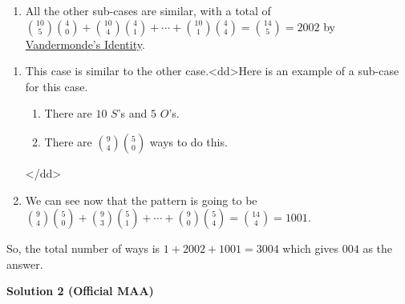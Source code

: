 \begin{enumerate}
            \begin{enumerate}[label=(\roman*)]
                <dd>
            \begin{enumerate}[label=(\roman*)]
                \item There are $6$ places to put the $I$'s (after the 0th, 2nd, 4th, 6th, 8th, and 10th $S$'s), and $4$ places to put the (0) $O$'s.  We use stars and bars to get an answer of $\binom{10}{5}\binom{4}{0}$<dt>Sub-case 2  --  There are $8$ $S$'s, $6$ $I$'s, and $1$ $O$.</dt>\item Similarly and by using stars and bars, we get an amount of $\binom{10}{4}\binom{4}{1}$
            \end{enumerate}
            </dd>\item All the other  sub-cases are similar, with a total of $\binom{10}{5}\binom{4}{0}+\binom{10}{4}\binom{4}{1}+\cdots+\binom{10}{1}\binom{4}{4}=\binom{14}{5}=2002$ by \href{https://artofproblemsolving.com/wiki/index.php?title=Combinatorial\_identity\#Vandermonde.27s\_Identity}{Vandermonde's Identity}.
            \end{enumerate}
            
            \begin{enumerate}[label=(\roman*)]
                <dt>Case 3  --  There are $5$ more $O$'s than $I$'s.</dt>\item This case is similar to the other case.<dd>Here is an example of a sub-case for this case.
            \begin{enumerate}[label=(\roman*)]
                <dt>Sub-case</dt>\item There are $10$ $S$'s and $5$ $O$'s.\item There are $\binom{9}{4}\binom{5}{0}$ ways to do this.
            \end{enumerate}
            </dd>\item We can see now that the pattern is going to be $\binom{9}{4}\binom{5}{0}+\binom{9}{3}\binom{5}{1}+\cdots+\binom{9}{0}\binom{5}{4}=\binom{14}{4}=1001$.
            \end{enumerate}
            
So, the total number of ways is $1+2002+1001=3004$ which gives $\boxed{004}$ as the answer.

 



\textbf{Solution 2 (Official MAA)}


\end{enumerate}
